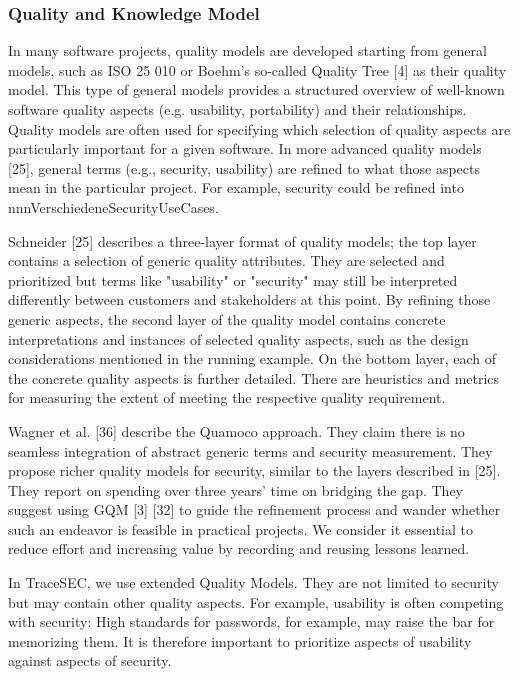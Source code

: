 \vspace{-0.5em}
\subsubsection*{Quality and Knowledge Model}
\vspace{-1em}
In many software projects, quality models are developed starting from general models, such as ISO 25 010 or Boehm’s so-called Quality Tree [4] as their quality model. This type of general models provides a structured overview of well-known software quality aspects (e.g. usability, portability) and their relationships. Quality models are often used for specifying which selection of quality aspects are particularly important for a given software. In more advanced quality models [25], general terms (e.g., security, usability) are refined to what those aspects mean in the particular project. For example, security could be refined into nnnVerschiedeneSecurityUseCases. 

Schneider [25] describes a three-layer format of quality models; the top layer contains a selection of generic quality attributes. They are selected and prioritized but terms like "usability" or "security" may still be interpreted differently between customers and stakeholders at this point. By refining those generic aspects, the second layer of the quality model contains concrete interpretations and instances of selected quality aspects, such as the design considerations mentioned in the running example. On the bottom layer, each of the concrete quality aspects is further detailed. There are heuristics and metrics for measuring the extent of meeting the respective quality requirement.  

Wagner et al. [36] describe the Quamoco approach. They claim there is no seamless integration of abstract generic terms and security measurement.  They propose richer quality models for security, similar to the layers described in [25]. They report on spending over three years’ time on bridging the gap. They suggest using GQM [3] [32] to guide the refinement process and wander whether such an endeavor is feasible in practical projects. We consider it essential to reduce effort and increasing value by recording and reusing lessons learned.

In TraceSEC, we use extended Quality Models. They are not limited to security but may contain other quality aspects. For example, usability is often competing with security: High standards for passwords, for example, may raise the bar for memorizing them. It is therefore important to prioritize aspects of usability against aspects of security.

